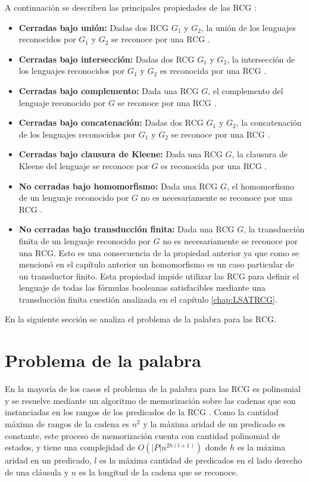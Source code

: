 A continuación se describen las principales propiedades de las RCG \cite{propertiesRCGBib}:
\begin{itemize}
    \item \textbf{Cerradas bajo unión:} Dadas dos RCG $G_1$ y $G_2$, la unión de los lenguajes reconocidos por $G_1$ y $G_2$ se reconoce por una RCG \cite{mainRCGBib}.
    \item \textbf{Cerradas bajo intersección:} Dadas dos RCG $G_1$ y $G_2$, la intersección de los lenguajes reconocidos por $G_1$ y $G_2$ es reconocida por una RCG \cite{mainRCGBib}.
    \item \textbf{Cerradas bajo complemento:} Dada una RCG $G$, el complemento del lenguaje reconocido por $G$ se reconoce por una RCG \cite{mainRCGBib}.
    \item \textbf{Cerradas bajo concatenación:} Dadas dos RCG $G_1$ y $G_2$, la concatenación de los lenguajes reconocidos por $G_1$ y $G_2$ se reconoce por una RCG \cite{mainRCGBib}.
    \item \textbf{Cerradas bajo clausura de Kleene:} Dada una RCG $G$, la clausura de Kleene del lenguaje se reconoce por $G$ es reconocida por una RCG \cite{mainRCGBib}.
    \item  \textbf{No cerradas bajo homomorfismo:} Dada una RCG $G$, el homomorfismo de un lenguaje reconocido por $G$ no es necesariamente se reconoce por una RCG \cite{propertiesRCGBib}.
    \item  \textbf{No cerradas bajo transducción finita:} Dada una RCG $G$, la transducción finita de un lenguaje reconocido por $G$ no es necesariamente se reconoce por una RCG.
          Esto es una consecuencia de la propiedad anterior ya que como se mencionó en el capítulo anterior un homomorfismo es un caso particular de un transductor finito.
          Esta propiedad impide utilizar las RCG para definir el lenguaje de todas las fórmulas booleanas satisfacibles
          mediante una transducción finita cuestión analizada en el capítulo \ref{chap:LSATRCG}.
\end{itemize}


En la siguiente sección se analiza el problema de la palabra para las RCG.

\section{Problema de la palabra}

En la mayoría de los casos el problema de la palabra para las RCG es polinomial y se resuelve
mediante un algoritmo de memorización sobre las cadenas que son instanciadas en los rangos de los predicados
de la RCG \cite{mainRCGBib}.  Como la cantidad máxima de rangos de la cadena es $n^2$ y la máxima aridad de un
predicado es constante, este proceso de memorización cuenta con cantidad polinomial de estados, y tiene una
complejidad de $O(|P|n^{2h(l+1)})$ donde $h$ es la máxima aridad en un predicado, $l$ es la máxima cantidad
de predicados en el lado derecho de una cláusula y $n$ es la longitud de la cadena que se reconoce.

